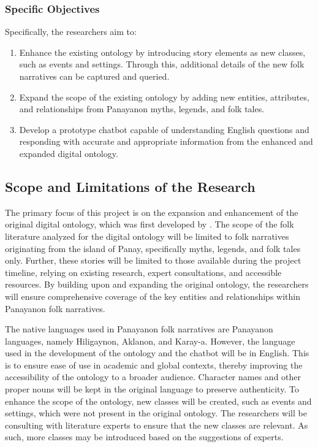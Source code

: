\subsubsection{Specific Objectives}
\label{subsec:specificobjectives}
Specifically, the researchers aim to:
\begin{enumerate}
    \item Enhance the existing ontology by introducing story elements as new classes, such as events and settings. Through this, additional details of the new folk narratives can be captured and queried.
    \item Expand the scope of the existing ontology by adding new entities, attributes, and relationships from Panayanon myths, legends, and folk tales. 
    \item Develop a prototype chatbot capable of understanding English questions and responding with accurate and appropriate information from the enhanced and expanded digital ontology.
\end{enumerate}


\subsection{Scope and Limitations of the Research}
\label{sec:scopelimitations}

The primary focus of this project is on the expansion and enhancement of the original digital ontology, which was first developed by . The scope of the folk literature analyzed for the digital ontology will be limited to folk narratives originating from the island of Panay, specifically myths, legends, and folk tales only. Further, these stories will be limited to those available during the project timeline, relying on existing research, expert consultations, and accessible resources. By building upon and expanding the original ontology, the researchers will ensure comprehensive coverage of the key entities and relationships within Panayanon folk narratives.

The native languages used in Panayanon folk narratives are Panayanon languages, namely Hiligaynon, Aklanon, and Karay-a. However, the language used in the development of the ontology and the chatbot will be in English. This is to ensure ease of use in academic and global contexts, thereby improving the accessibility of the ontology to a broader audience. Character names and other proper nouns will be kept in the original language to preserve authenticity.
To enhance the scope of the ontology, new classes will be created, such as events and settings, which were not present in the original ontology. The researchers will be consulting with literature experts to ensure that the new classes are relevant. As such, more classes may be introduced based on the suggestions of experts.


